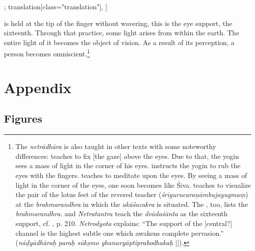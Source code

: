 \begin{alignment}[
  texts=edition[class="edition"];
  translation[class="translation"],
  ]
\begin{translation}
\begin{tlate} is held at the tip of the finger without wavering, this is the eye support, the sixteenth. Through that practice, some light arises from within the earth. The entire light of it becomes the object of vision. As a result of its perception, a person becomes omniscient.\footnote{The \textit{netrādhāra} is also taught in other texts with some noteworthy differences:  teaches to fix [the gaze] above the eyes. Due to that, the yogin sees a mass of light in the corner of his eyes.  instructs the yogin to rub the eyes with the fingers.  teaches to meditate upon the eyes. By seeing a mass of light in the corner of the eyes, one soon becomes like Śiva.  teaches to visualize the pair of the lotus feet of the revered teacher (\textit{śrīgurucaraṇāmbujayugmaṃ}) at the \textit{brahmarandhra} in which the \textit{akāśacakra} is situated. The , too, lists the \textit{brahmarandhra}.  and \textit{Netratantra} teach the \textit{dvādaśānta} as the sixteenth support, cf. , p. 210. \textit{Netrodyota} explains: ``The support of the [central?] channel is the highest subtle one which awakens complete pervasion.'' (\textit{nāḍyādhāraḥ paraḥ sūkṣmo ghanavyāptiprabodhakaḥ} ||).}
      \flushpage 
    \end{tlate}
  \end{translation}
\end{alignment}
\pagebreak %
\chapter{Appendix}
\section{Figures}

